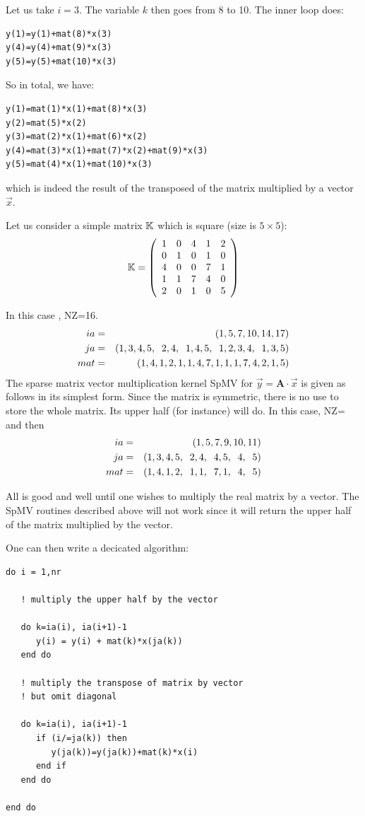 Let us take $i=3$. The variable $k$ then goes from 8 to 10. 
The inner loop does:
\begin{verbatim}
y(1)=y(1)+mat(8)*x(3)
y(4)=y(4)+mat(9)*x(3)
y(5)=y(5)+mat(10)*x(3)
\end{verbatim}

So in total, we have:
\begin{verbatim}
y(1)=mat(1)*x(1)+mat(8)*x(3)
y(2)=mat(5)*x(2)
y(3)=mat(2)*x(1)+mat(6)*x(2)
y(4)=mat(3)*x(1)+mat(7)*x(2)+mat(9)*x(3)
y(5)=mat(4)*x(1)+mat(10)*x(3)
\end{verbatim}
which is indeed the result of the transposed of the matrix multiplied by a vector $\vec{x}$.

\vspace{0.6cm}

Let us consider a simple matrix ${\mathbb{K}}$ which is square (size is $5\times5$):
\[
{\mathbb{K}}=
\left(
\begin{array}{ccccc}
1&0&4&1&2\\
0&1&0&1&0\\
4&0&0&7&1\\
1&1&7&4&0\\
2&0&1&0&5
\end{array}
\right)
\]

In this case , NZ=16.
\begin{eqnarray}
ia &=&(1,5,7,10,14,17) \nonumber\\
ja &=&(1,3,4,5,\;\; 2,4, \;\; 1,4,5, \;\; 1,2,3,4, \;\; 1,3,5) \nonumber\\
mat&=&(1,4,1,2,1,1,4,7,1,1,1,7,4,2,1,5) \nonumber
\end{eqnarray}
The sparse matrix vector multiplication kernel SpMV for $\vec{y} = {\bm A}\cdot \vec{x}$ 
is given  as follows in its simplest form.
Since the matrix is symmetric, there is no use to store the whole matrix. Its upper half (for instance) will do. 
In this case, NZ=
and then 
\begin{eqnarray}
ia &=&(1,5,7,9,10,11) \nonumber\\
ja &=&(1,3,4,5,\;\; 2,4, \;\; 4,5, \;\; 4, \;\; 5) \nonumber\\
mat&=&(1,4,1,2,\;\; 1,1, \;\; 7,1, \;\; 4,\;\; 5) \nonumber
\end{eqnarray}

All is good and well until one wishes to multiply the real matrix by a vector. 
The SpMV routines described above will not work since it will return the upper half of the matrix 
multiplied by the vector.

One can then write a decicated algorithm:
\begin{verbatim}
do i = 1,nr

   ! multiply the upper half by the vector

   do k=ia(i), ia(i+1)-1
      y(i) = y(i) + mat(k)*x(ja(k))
   end do

   ! multiply the transpose of matrix by vector
   ! but omit diagonal 

   do k=ia(i), ia(i+1)-1
      if (i/=ja(k)) then
         y(ja(k))=y(ja(k))+mat(k)*x(i)
      end if
   end do

end do
\end{verbatim}


